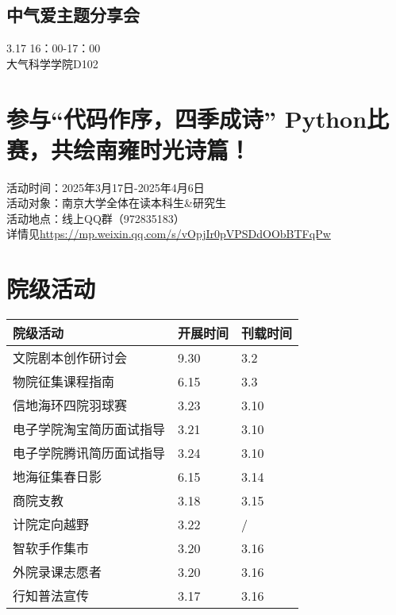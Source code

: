 \documentclass[letterpaper, 12pt]{article}
\begin{document}
\begin{multicols}{2}
\subsection{中气爱主题分享会}
3.17 16：00-17：00\\
大气科学学院D102\\


\section{参与“代码作序，四季成诗” Python比赛，共绘南雍时光诗篇！}
活动时间：2025年3月17日-2025年4月6日\\
活动对象：南京大学全体在读本科生\&研究生\\
活动地点：线上QQ群（972835183）\\
详情见\url{https://mp.weixin.qq.com/s/vOpjIr0pVPSDdOObBTFqPw}\\




\section{院级活动}
\begin{tabular}{|>{\centering\arraybackslash}m{}|m{}|m{}|}
    \hline
    院级活动 & 开展时间 & 刊载时间\\
    \hline\hline
    文院剧本创作研讨会 & 9.30 & 3.2\\
    物院征集课程指南 & 6.15 & 3.3\\
    信地海环四院羽球赛 & 3.23 & 3.10\\
    电子学院淘宝简历面试指导 & 3.21 & 3.10\\
    电子学院腾讯简历面试指导 & 3.24 & 3.10\\
    地海征集春日影 & 6.15 & 3.14\\
    商院支教 & 3.18 & 3.15\\
    计院定向越野 & 3.22 & / \\
    智软手作集市 & 3.20 & 3.16\\
    外院录课志愿者 & 3.20 & 3.16\\
    行知普法宣传 & 3.17 & 3.16\\
    \hline
\end{tabular}

\end{multicols}
\end{document}

